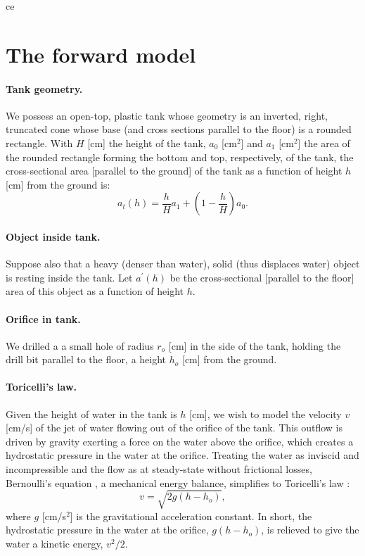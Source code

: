 \documentclass[openacc]{rsproca_new}%
\begin{document}
ce

\section{The forward model}

\paragraph{Tank geometry.}
We possess an open-top, plastic tank whose geometry is an inverted, right, truncated cone whose base (and cross sections parallel to the floor) is a rounded rectangle. 
With $H$ [cm] the height of the tank, $a_0$ [cm$^2$] and $a_1$ [cm$^2$] the area of the rounded rectangle forming the bottom and top, respectively, of the tank, the cross-sectional area [parallel to the ground] of the tank as a function of height $h$ [cm] from the ground is:
\begin{equation}
a_t(h) = \frac{h}{H}a_1 + \left(1-\frac{h}{H}\right) a_0.
\end{equation}

\paragraph{Object inside tank.} Suppose also that a heavy (denser than water), solid (thus displaces water) object is resting inside the tank. Let $a^\prime(h)$ be the cross-sectional [parallel to the floor] area of this object as a function of height $h$. 

\paragraph{Orifice in tank.} We drilled a a small hole of radius $r_o$ [cm] in the side of the tank, holding the drill bit parallel to the floor, a height $h_o$ [cm] from the ground. 

\paragraph{Toricelli's law.} Given the height of water in the tank is $h$ [cm], we wish to model the velocity $v$ [cm/s] of the jet of water flowing out of the orifice of the tank. This outflow is driven by gravity exerting a force on the water above the orifice, which creates a hydrostatic pressure in the water at the orifice. 
Treating the water as inviscid and incompressible and the flow as at steady-state without frictional losses, Bernoulli's equation \cite{welty2020fundamentals}, a mechanical energy balance, simplifies to Toricelli's law \cite{d2021torricelli}:
\begin{equation}
	v =  \sqrt{2 g(h-h_o)}, \label{eq:Toricelli}
\end{equation} where $g$ [cm/s$^2$] is the gravitational acceleration constant. In short, the hydrostatic pressure in the water at the orifice, $g(h-h_o)$, is relieved to give the water a kinetic energy, $v^2/2$.
\end{document}

